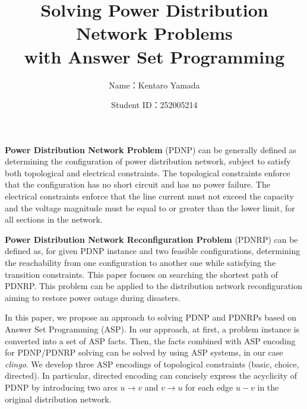 \documentclass[dvipdfmx,a4paper]{jsarticle}
\title{Solving Power Distribution Network Problems \\ with Answer Set Programming}
\author{Name：Kentaro Yamada}
\date{Student ID：252005214}
\begin{document}
\maketitle

\textbf{Power Distribution Network Problem} (PDNP) can be generally 
defined as determining the configuration of power distribution network,
subject to satisfy both topological and electrical constraints. 
% 
The topological constraints enforce that the configuration has
no short circuit and has no power failure.
%
The electrical constraints enforce that
the line current must not exceed the capacity 
and the voltage magnitude must be equal to or greater 
than the lower limit, for all sections in the network.

%

\textbf{Power Distribution Network Reconfiguration Problem} (PDNRP) can be
defined as, for given PDNP instance and two feasible configurations, determining 
the reachability from one configuration to another one while satisfying 
the transition constraints. This paper focuses on searching the shortest path 
of PDNRP.
%
This problem can be applied to the distribution 
network reconfiguration aiming to restore power outage during disasters.


In this paper, we propose an approach to solving PDNP and PDNRPs
based on Answer Set Programming (ASP).
%
In our approach, at first, a problem instance is converted into 
a set of ASP facts. 
%
Then, the facts combined with ASP encoding
for PDNP/PDNRP solving can be solved by using ASP systems,
in our case \textit{clingo}.
%
We develop three ASP encodings of topological constraints
(\textsf{basic}, \textsf{choice}, \textsf{directed}).
%
In particular, \textsf{directed} encoding can concisely express 
the acyclicity of PDNP by introducing
two arcs $u \rightarrow v$ and $v \rightarrow u$ 
for each edge $u-v$ in the original distribution network.
\end{document}
